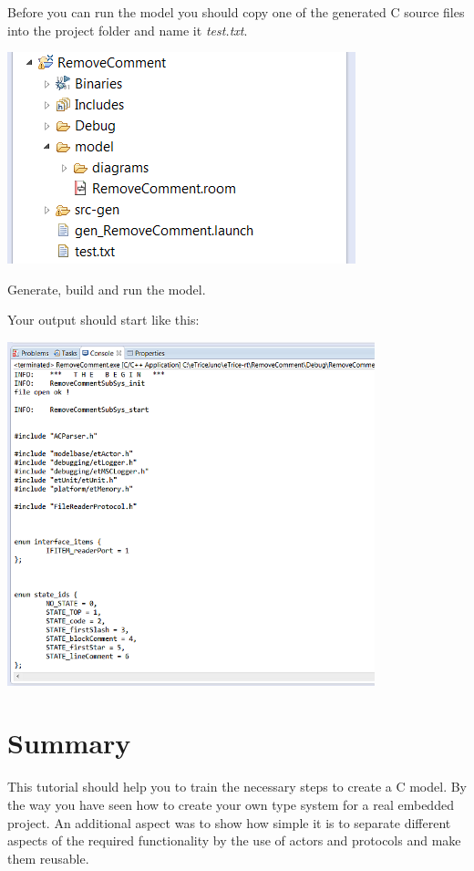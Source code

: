 Before you can run the model you should copy one of the generated C source files into the project folder 
and name it \textit{test.txt}. 

\includegraphics{images/036-RemoveCommentC07.png}

Generate, build and run the model.

Your output should start like this:

\includegraphics[width=0.8\textwidth]{images/036-RemoveCommentC08.png}


\section{Summary}

This tutorial should help you to train the necessary steps to create a C model. By the way you have seen 
how to create your own type system for a real embedded project. An additional aspect was to show how 
simple it is to separate different aspects of the required functionality by the use of actors and 
protocols and make them reusable.
